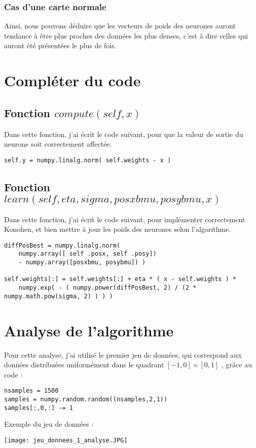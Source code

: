 \documentclass{article}
\begin{document}
\subsubsection{Cas d'une carte normale}

Ainsi, nous pouvons déduire que les vecteurs de poids des neurones auront tendance à être plus proches des données les plus denses, c'est à dire celles qui auront été présentées le plus de fois.





\section{Compléter du code}


\subsection{Fonction $compute(self, x)$}

Dans cette fonction, j'ai écrit le code suivant, pour que la valeur de sortie du neurone soit correctement affectée.
\begin{verbatim}
self.y = numpy.linalg.norm( self.weights - x )
\end{verbatim}


\subsection{Fonction $learn(self, eta, sigma, posxbmu, posybmu, x)$}
Dans cette fonction, j'ai écrit le code suivant, pour implémenter correctement Konohen, et bien mettre à jour les poids des neurones selon l'algorithme.
\begin{verbatim}
diffPosBest = numpy.linalg.norm(
    numpy.array([ self .posx, self .posy])
    - numpy.array([posxbmu, posybmu]) )

self.weights[:] = self.weights[:] + eta * ( x - self.weights ) *
    numpy.exp( - ( numpy.power(diffPosBest, 2) / (2 * numpy.math.pow(sigma, 2) ) ) )
\end{verbatim}


\section{Analyse de l'algorithme}
Pour cette analyse, j'ai utilisé le premier jeu de données, qui correspond aux données distribuées uniformément dans le quadrant $[-1,0] \times [0,1]$ , grâce au code :
\begin{verbatim}
nsamples = 1500
samples = numpy.random.random((nsamples,2,1))
samples[:,0,:] -= 1
\end{verbatim}
Exemple du jeu de données :
\begin{center}
\texttt{[image: jeu\_donnees\_1\_analyse.JPG]}
\label{fig1}
\end{center}
\end{document}
